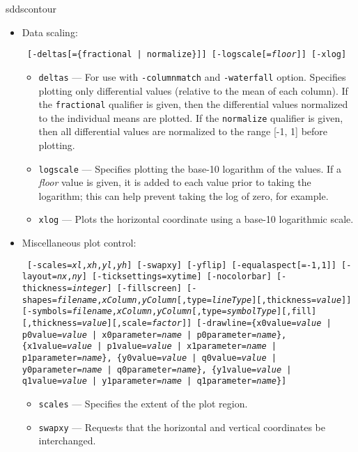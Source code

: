 \begin{sddsprog}{sddscontour}
\begin{itemize}
    \item Data scaling:
\begin{flushleft}{\tt
[-deltas[=\{fractional | normalize\}]] [-logscale[={\em floor}]] [-xlog]
}\end{flushleft}
        \begin{itemize}
        \item \verb|deltas| --- For use with \verb|-columnmatch| and \verb|-waterfall| option.  Specifies plotting
        only differential values (relative to the mean of each column).  If the \verb|fractional|
        qualifier is given, then the differential values normalized to the individual
        means are plotted.  If the \verb|normalize| qualifier is given, then all differential values
        are normalized to the range [-1, 1] before plotting.
        \item \verb|logscale| --- Specifies plotting the base-10 logarithm of the values.  If a
        {\em floor} value is given, it is added to each value prior to taking the logarithm; this
        can help prevent taking the log of zero, for example.
        \item \verb|xlog| --- Plots the horizontal coordinate using a base-10 logarithmic scale.
        \end{itemize}
    \item Miscellaneous plot control:
\begin{flushleft}{\tt
[-scales={\em xl},{\em xh},{\em yl},{\em yh}]
[-swapxy] [-yflip] [-equalaspect[={-1,1}]]
[-layout={\em nx},{\em ny}] [-ticksettings={xy}time]
[-nocolorbar] [-thickness={\em integer}] [-fillscreen]
[-shapes={\em filename},{\em xColumn},{\em yColumn}[,type={\em lineType}][,thickness={\em value}]]
[-symbols={\em filename},{\em xColumn},{\em yColumn}[,type={\em symbolType}][,fill][,thickness={\em value}][,scale={\em factor}]]
[-drawline=\{x0value={\em value} | p0value={\em value} | x0parameter={\em name} | p0parameter={\em name}\},
            \{x1value={\em value} | p1value={\em value} | x1parameter={\em name} | p1parameter={\em name}\},
            \{y0value={\em value} | q0value={\em value} | y0parameter={\em name} | q0parameter={\em name}\},
            \{y1value={\em value} | q1value={\em value} | y1parameter={\em name} | q1parameter={\em name}\}]
}\end{flushleft}
        \begin{itemize}
        \item \verb|scales| --- Specifies the extent of the plot region.
        \item \verb|swapxy| --- Requests that the horizontal and vertical coordinates be interchanged.

\end{itemize}
\end{itemize}
\end{sddsprog}
